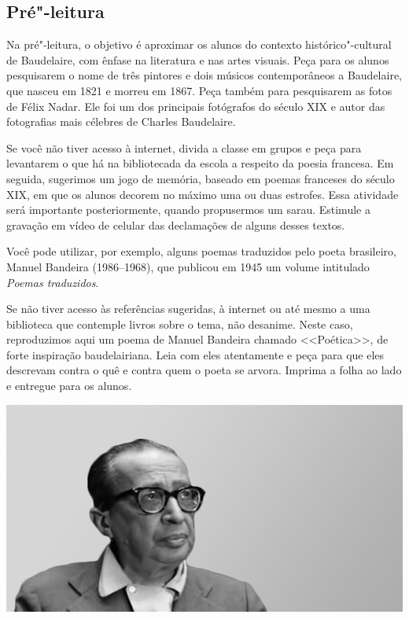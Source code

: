 \documentclass[12pt]{extarticle}
\begin{document}
\subsection{Pré"-leitura}

\bnccativividadespreleitura


Na pré"-leitura, o objetivo é aproximar os alunos do contexto
histórico"-cultural de Baudelaire, com ênfase na literatura e nas artes
visuais. Peça para os alunos pesquisarem o nome de três pintores e 
dois músicos contemporâneos a Baudelaire, que nasceu em 1821 e 
morreu em 1867. Peça também para pesquisarem as fotos de Félix Nadar. Ele foi 
um dos principais fotógrafos do século XIX e autor das 
fotografias mais célebres de Charles Baudelaire.  

Se você não tiver acesso à internet, divida a classe em grupos e 
peça para levantarem o que há na bibliotecada da escola a respeito da poesia 
francesa. Em seguida, sugerimos um jogo de memória, 
baseado em poemas franceses do século
XIX, em que os alunos decorem no máximo uma ou duas estrofes. 
Essa atividade será importante posteriormente, 
quando propusermos um sarau. Estimule a gravação em vídeo de celular das declamações
de alguns desses textos. 

Você pode utilizar, por exemplo, alguns poemas
traduzidos pelo poeta brasileiro, Manuel Bandeira (1986--1968), 
que publicou em 1945 um volume intitulado \textit{Poemas traduzidos}. 

Se não tiver acesso às referências sugeridas, à internet ou até mesmo a uma 
biblioteca que contemple livros sobre o tema, não desanime. 
Neste caso, reproduzimos aqui um poema de Manuel Bandeira chamado <<Poética>>, de forte 
inspiração baudelairiana. Leia com eles atentamente e peça para 
que eles descrevam contra o quê e contra quem o poeta se arvora. Imprima a folha 
ao lado e entregue para os alunos.

\pagebreak
\includegraphics[width=.8\textwidth]{./images/PNLD0010-22}
\end{document}

